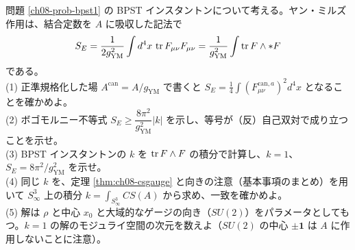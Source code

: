 \begin{problem}[難易度 C]\label{ch08-prob-bpst2}
問題 \ref{ch08-prob-bpst1} の BPST インスタントンについて考える。ヤン・ミルズ作用は、結合定数を $A$ に吸収した記法で
\[
S_E=\frac{1}{2g_{\mathrm{YM}}^2}\int d^4x\,\tr F_{\mu\nu}F_{\mu\nu}=\frac{1}{g_{\mathrm{YM}}^2}\int\tr F\wedge*F
\]
である。\\
(1) 正準規格化した場 $A^{\mathrm{can}}=A/g_{\mathrm{YM}}$ で書くと $S_E=\frac14\int(F^{\mathrm{can},a}_{\mu\nu})^2d^4x$ となることを確かめよ。\\
(2) ボゴモルニー不等式 $S_E\ge\dfrac{8\pi^2}{g_{\mathrm{YM}}^2}\lvert k\rvert$ を示し、等号が（反）自己双対で成り立つことを示せ。\\
(3) BPST インスタントンの $k$ を $\tr F\wedge F$ の積分で計算し、$k=1$、$S_E=8\pi^2/g_{\mathrm{YM}}^2$ を示せ。\\
(4) 同じ $k$ を、定理 \ref{thm:ch08-csgauge} と向きの注意（基本事項のまとめ）を用いて $S^3_\infty$ 上の積分 $k=\int_{S^3_\infty}CS(A)$ から求め、一致を確かめよ。\\
(5) 解は $\rho$ と中心 $x_0$ と大域的なゲージの向き（$SU(2)$）をパラメータとしてもつ。$k=1$ の解のモジュライ空間の次元を数えよ（$SU(2)$ の中心 $\pm\mathbf 1$ は $A$ に作用しないことに注意）。
\end{problem}

